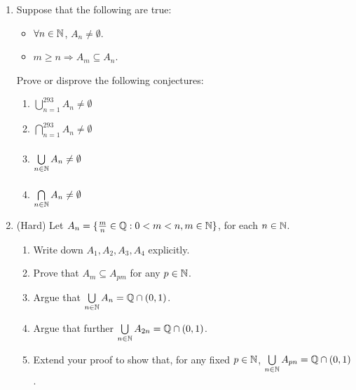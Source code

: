 \begin{exercises}{}{}
\begin{enumerate}
  \item Suppose that the following are true:
  \begin{itemize}
    \item $\forall n\in\mathbb{N}$, $A_n\neq\emptyset$.
    \item $m\ge n\Longrightarrow A_m\subseteq A_n$.
  \end{itemize}
  Prove or disprove the following conjectures:\\
	\begin{minipage}{0.4\textwidth}
  \begin{enumerate}
    \item $\bigcup\limits_{n=1}^{293}A_n\neq\emptyset$
    \item $\bigcap\limits_{n=1}^{293}A_n\neq\emptyset$
	\end{enumerate}
	\end{minipage}
	\begin{minipage}{0.4\textwidth}
  \begin{enumerate}\setcounter{enumii}{2}
    \item $\bigcup\limits_{n\in\mathbb{N}}^{\phantom{293}}A_n\neq\emptyset$
		\item $\bigcap\limits_{n\in\mathbb{N}}^{\phantom{293}}A_n\neq\emptyset$
	\end{enumerate}
	\end{minipage}

	\item (Hard) Let $A_n=\{\frac mn\in\mathbb{Q}:0<m<n, m\in \mathbb{N}\}$, for each $n\in\mathbb{N}$.
	\begin{enumerate}
		\item Write down $A_1,A_2,A_3,A_4$ explicitly.
		\item Prove that $A_m\subseteq A_{pm}$ for any $p\in\mathbb{N}$.
		\item Argue that $\bigcup\limits_{n\in\mathbb{N}}A_n=\mathbb{Q}\cap (0,1)$.
		\item Argue that further $\bigcup\limits_{n\in\mathbb{N}}A_{2n}=\mathbb{Q}\cap (0,1)$.
		\item Extend your proof to show that, for any fixed $p\in\mathbb{N}$, $\bigcup\limits_{n\in\mathbb{N}}A_{pn}=\mathbb{Q}\cap (0,1)$.
	\end{enumerate}
	

\end{enumerate}
\end{exercises}
